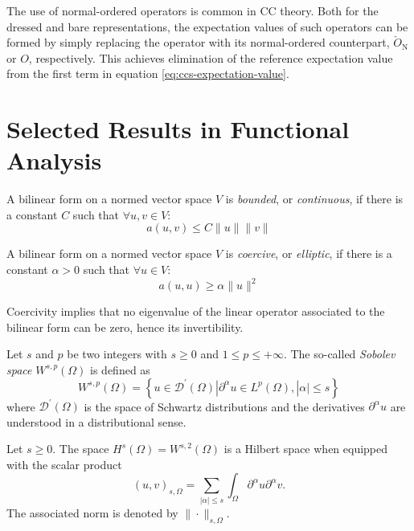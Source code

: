 The use of normal-ordered operators is common in \acrlong{CC} theory. Both for
the dressed and bare representations, the expectation values of such operators
can be formed by simply replacing the operator with its normal-ordered counterpart,
$\check{O}_\mathrm{N}$ or $O$, respectively.
This achieves elimination of the reference expectation value from the first
term in equation \eqref{eq:ccs-expectation-value}.

\section{Selected Results in Functional Analysis}

\begin{defin}[Continuity]\label{def:continuity}
  A bilinear form on a normed vector space $V$ is \emph{bounded}, or
  \emph{continuous}, if there is a constant $C$ such that
  $\forall u, v \in V$:
  \[
  a(u, v) \leq C\lVert u\rVert\lVert v\rVert
  \]
\end{defin}

\begin{defin}[Coercivity]\label{def:coercivity}
  A bilinear form on a normed vector space $V$ is \emph{coercive},
  or \emph{elliptic}, if there is a constant $\alpha >0$ such that
  $\forall u \in V$:
  \[
  a(u, u) \geq \alpha\lVert u\rVert^2
  \]
\end{defin}
Coercivity implies that no eigenvalue of the linear operator associated to the
bilinear form can be zero, hence its invertibility.\autocite{Ern2004-oo}

\begin{defin}
Let $s$ and $p$ be two integers with $s\geq 0$ and $1\leq p \leq +\infty$.
The so-called \emph{Sobolev space} $W^{s, p}(\Omega)$ is defined as
\begin{equation}
W^{s,p}(\Omega) =
\left\lbrace
u \in \mathcal{D}^\prime(\Omega) | \partial^\alpha u \in L^p(\Omega), |\alpha|\leq s
\right\rbrace
\end{equation}
where $\mathcal{D}^\prime(\Omega)$ is the space of Schwartz distributions and the
derivatives $\partial^\alpha u$ are understood in a distributional sense.
\end{defin}

\begin{lemma}
Let $s\geq 0$. The space $H^s(\Omega) = W^{s, 2}(\Omega)$ is a Hilbert space
when equipped with the scalar product
\begin{equation}
(u, v)_{s, \Omega} = \sum_{|\alpha|\leq s}\int_\Omega\partial^\alpha u \partial^\alpha v.
\end{equation}
The associated norm is denoted by $\| \cdot \|_{s, \Omega}$.
\end{lemma}

